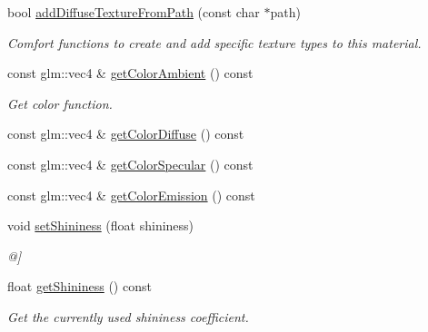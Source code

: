 \begin{DoxyCompactItemize}
bool \mbox{\hyperlink{classec_1_1_material_a15b5c4adb903b16c25ad312963027924}{add\+Diffuse\+Texture\+From\+Path}} (const char $\ast$path)
\begin{DoxyCompactList}\small\item\em Comfort functions to create and add specific texture types to this material. \end{DoxyCompactList}\item 
const glm\+::vec4 \& \mbox{\hyperlink{classec_1_1_material_a68e143f6390ae7e9bc6c080853191f94}{get\+Color\+Ambient}} () const
\begin{DoxyCompactList}\small\item\em Get color function. \end{DoxyCompactList}\item 
const glm\+::vec4 \& \mbox{\hyperlink{classec_1_1_material_a6156c82b63756da91d013b5eb39fccf5}{get\+Color\+Diffuse}} () const
\item 
const glm\+::vec4 \& \mbox{\hyperlink{classec_1_1_material_a0a4a766b22c9adeffdff5c0d5140167e}{get\+Color\+Specular}} () const
\item 
const glm\+::vec4 \& \mbox{\hyperlink{classec_1_1_material_af6a4a55683956cd0b06d0a8de1dc4b9f}{get\+Color\+Emission}} () const
\item 
void \mbox{\hyperlink{classec_1_1_material_a4b9efb15466a547d4579566dfb1e558f}{set\+Shininess}} (float shininess)
\begin{DoxyCompactList}\small\item\em @\mbox{]} \end{DoxyCompactList}\item 
float \mbox{\hyperlink{classec_1_1_material_a125ba490c4191f8f6fe77e76934ed33a}{get\+Shininess}} () const
\begin{DoxyCompactList}\small\item\em Get the currently used shininess coefficient. \end{DoxyCompactList}\end{DoxyCompactItemize}
\textbf{ }\par
